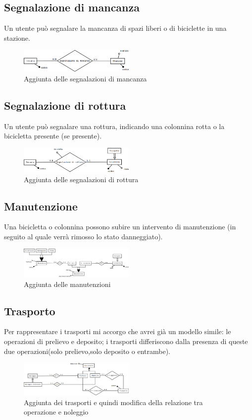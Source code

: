 \documentclass[a4paper,twoside]{article}
\begin{document}
\subsection{Segnalazione di mancanza}
Un utente può segnalare la mancanza di spazi liberi o di biciclette in una stazione.
\begin{figure}[H]
 \centering
  \includegraphics[width=0.5\textwidth]{Immagini-Grafici/Concettuale10.png}
\caption{Aggiunta delle segnalazioni di mancanza}
\end{figure}

\subsection{Segnalazione di rottura}
Un utente può segnalare una rottura, indicando una colonnina rotta o la bicicletta presente (se presente).
\begin{figure}[H]
 \centering
  \includegraphics[width=0.5\textwidth]{Immagini-Grafici/Concettuale11.png}
\caption{Aggiunta delle segnalazioni di rottura}
\end{figure}

\subsection{Manutenzione}
Una bicicletta o colonnina possono subire un intervento di manutenzione (in seguito al quale verrà rimosso lo stato danneggiato).
\begin{figure}[H]
 \centering
  \includegraphics[width=0.5\textwidth]{Immagini-Grafici/Concettuale12.png}
\caption{Aggiunta delle manutenzioni}
\end{figure}

\subsection{Trasporto}
Per rappresentare i trasporti mi accorgo che avrei già un modello simile: le operazioni di prelievo e deposito; i trasporti differiscono dalla presenza di queste due operazioni(solo prelievo,solo deposito o entrambe).
\begin{figure}[H]
 \centering
  \includegraphics[width=0.5\textwidth]{Immagini-Grafici/Concettuale13.png}
\caption{Aggiunta dei trasporti e quindi modifica della relazione tra operazione e noleggio}
\end{figure}
\end{document}
